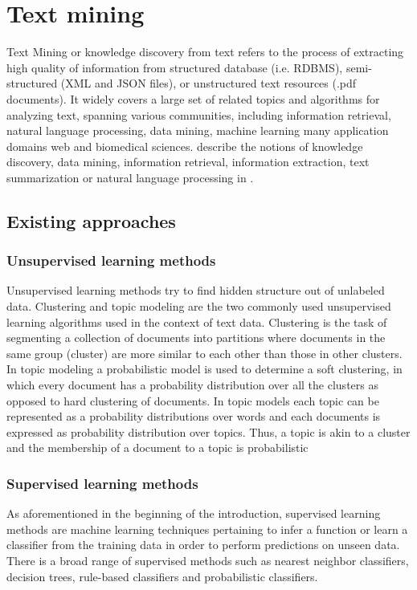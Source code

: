 \section{Text mining}
Text Mining or knowledge discovery from text refers to the process of extracting high quality of information from structured database (i.e. RDBMS), semi-structured (\ie XML and JSON files), or unstructured text resources (\ie .pdf documents).
It widely covers a large set of related topics and algorithms for analyzing text, spanning various communities, including information retrieval, natural language processing, data mining, machine learning many application domains web and biomedical sciences.
\citeauthor{Allahyari2017} describe the notions of knowledge discovery, data mining, information retrieval, information extraction, text summarization or natural language processing in \citep{Allahyari2017}.

\subsection{Existing approaches}
\subsubsection{Unsupervised learning methods}
Unsupervised learning methods try to find hidden structure out of unlabeled data. Clustering and topic modeling are the two commonly used unsupervised learning algorithms used in the context of text data. 
\newline
Clustering is the task of segmenting a collection of documents into partitions where documents in the same group (cluster) are more similar to each other than those in other clusters. 
\newline
In topic modeling a probabilistic model is used to determine a soft clustering, in which every document has a probability distribution over all the clusters as opposed to hard clustering of documents. 
In topic models each topic can be represented as a probability distributions over words and each documents is expressed as probability distribution over topics. 
Thus, a topic is akin to a cluster and the membership of a document to a topic is probabilistic

\subsubsection{Supervised learning methods}
As aforementioned in the beginning of the introduction, supervised learning methods are machine learning techniques pertaining to infer a function or learn a classifier from the training data in order to perform predictions on unseen data. 
There is a broad range of supervised methods such as nearest neighbor classifiers, decision trees, rule-based classifiers and probabilistic classifiers.

